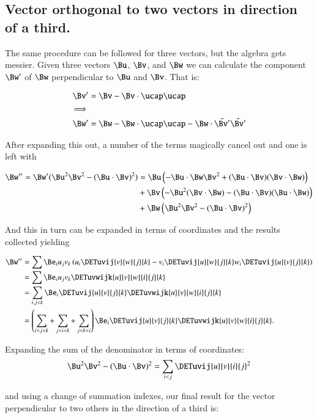 \subsection{Vector orthogonal to two vectors in direction of a third. }

The same procedure can be followed for three vectors, but the algebra gets messier.  Given three vectors $\Bu$, $\Bv$, and $\Bw$
we can calculate the component $\Bw'$ of $\Bw$ perpendicular to $\Bu$ and $\Bv$.  That is:

\begin{align*}
\Bv' &= \Bv - \Bv \cdot \ucap \ucap \\
\implies & \\
\Bw' &= \Bw - \Bw \cdot \ucap \ucap - \Bw \cdot \hat{\Bv'} \hat{\Bv'}
\end{align*}

After expanding this out, a number of the terms magically cancel out and one is left with

\begin{align*}
\Bw'' = \Bw' (\Bu^2\Bv^2 - (\Bu \cdot \Bv)^2)
&= \Bu \left(-\Bu \cdot \Bw \Bv^2 + (\Bu \cdot \Bv)(\Bv \cdot \Bw)\right)  \\
&+ \Bv \left(-\Bu^2(\Bv \cdot \Bw) - (\Bu \cdot \Bv)(\Bu \cdot \Bw)\right)  \\
&+ \Bw \left(\Bu^2\Bv^2 - (\Bu \cdot \Bv)^2\right) \\
\end{align*}

And this in turn can be expanded in terms of coordinates and the results collected yielding

\begin{align*}
\Bw'' &= \sum \Be_i u_j v_k \left(
u_i \DETuvij{v}{w}{j}{k}
-v_i \DETuvij{u}{w}{j}{k}
w_i \DETuvij{u}{v}{j}{k}
\right) \\
&= \sum \Be_i u_j v_k \DETuvwijk{u}{v}{w}{i}{j}{k} \\
&= \sum_{i,j<k} \Be_i \DETuvij{u}{v}{j}{k} \DETuvwijk{u}{v}{w}{i}{j}{k} \\
&= 
\left(\sum_{i<j<k} + \sum_{j<i<k} + \sum_{j<k<i} \right) \Be_i \DETuvij{u}{v}{j}{k} \DETuvwijk{u}{v}{w}{i}{j}{k}.
\end{align*}

Expanding the sum of the denominator in terms of coordinates:
\[
\Bu^2\Bv^2 - (\Bu \cdot \Bv)^2 = \sum_{i<j} \DETuvij{u}{v}{i}{j}^2
\]

and using a change of summation indexes, our final result for the vector perpendicular to two others in the direction of a third is:

